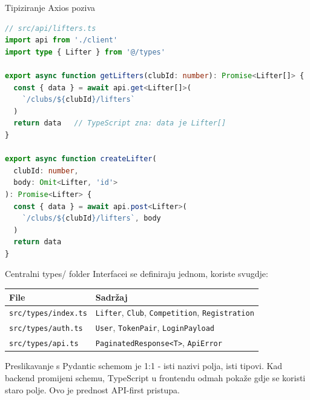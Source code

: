 \begin{frame}[fragile,shrink=5]{Tipiziranje Axios poziva}
\begin{lstlisting}[language=typescript]
// src/api/lifters.ts
import api from './client'
import type { Lifter } from '@/types'

export async function getLifters(clubId: number): Promise<Lifter[]> {
  const { data } = await api.get<Lifter[]>(
    `/clubs/${clubId}/lifters`
  )
  return data   // TypeScript zna: data je Lifter[]
}

export async function createLifter(
  clubId: number,
  body: Omit<Lifter, 'id'>
): Promise<Lifter> {
  const { data } = await api.post<Lifter>(
    `/clubs/${clubId}/lifters`, body
  )
  return data
}
\end{lstlisting}
\end{frame}

\begin{frame}{Centralni types/ folder}
Interfacei se definiraju jednom, koriste svugdje:

\vspace{0.4em}
\begin{tabular}{@{}lp{9cm}@{}}
  \toprule
  \textbf{File} & \textbf{Sadržaj} \\
  \midrule
  \texttt{src/types/index.ts} & \texttt{Lifter}, \texttt{Club}, \texttt{Competition}, \texttt{Registration} \\
  \texttt{src/types/auth.ts} & \texttt{User}, \texttt{TokenPair}, \texttt{LoginPayload} \\
  \texttt{src/types/api.ts} & \texttt{PaginatedResponse<T>}, \texttt{ApiError} \\
  \bottomrule
\end{tabular}

\vspace{0.6em}
Preslikavanje s Pydantic schemom je 1:1 - isti nazivi polja, isti tipovi. Kad backend promijeni schemu, TypeScript u frontendu odmah pokaže gdje se koristi staro polje. Ovo je prednost API-first pristupa.
\end{frame}

